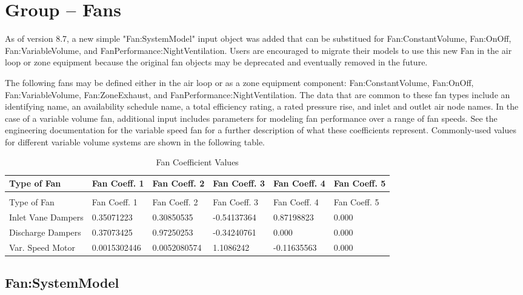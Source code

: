 \section{Group -- Fans}\label{group-fans}

As of version 8.7, a new simple "Fan:SystemModel" input object was added that can be substitued for Fan:ConstantVolume, Fan:OnOff, Fan:VariableVolume, and FanPerformance:NightVentilation.  Users are encouraged to migrate their models to use this new Fan in the air loop or zone equipment because the original fan objects may be deprecated and eventually removed in the future. 

The following fans may be defined either in the air loop or as a zone equipment component: Fan:ConstantVolume, Fan:OnOff, Fan:VariableVolume, Fan:ZoneExhaust, and FanPerformance:NightVentilation. The data that are common to these fan types include an identifying name, an availability schedule name, a total efficiency rating, a rated pressure rise, and inlet and outlet air node names. In the case of a variable volume fan, additional input includes parameters for modeling fan performance over a range of fan speeds. See the engineering documentation for the variable speed fan for a further description of what these coefficients represent. Commonly-used values for different variable volume systems are shown in the following table.

\begin{longtable}[c]{p{1.0in}p{1.0in}p{1.0in}p{1.0in}p{1.0in}p{1.0in}}
\caption{Fan Coefficient Values \label{table:fan-coefficient-values}} \tabularnewline
\toprule 
Type of Fan & Fan Coeff. 1 & Fan Coeff. 2 & Fan Coeff. 3 & Fan Coeff. 4 & Fan Coeff. 5 \tabularnewline
\midrule
\endfirsthead

\caption[]{Fan Coefficient Values} \tabularnewline
\toprule 
Type of Fan & Fan Coeff. 1 & Fan Coeff. 2 & Fan Coeff. 3 & Fan Coeff. 4 & Fan Coeff. 5 \tabularnewline
\midrule
\endhead

Inlet Vane Dampers & 0.35071223 & 0.30850535 & -0.54137364 & 0.87198823 & 0.000 \tabularnewline
Discharge Dampers & 0.37073425 & 0.97250253 & -0.34240761 & 0.000 & 0.000 \tabularnewline
Var. Speed Motor & 0.0015302446 & 0.0052080574 & 1.1086242 & -0.11635563 & 0.000 \tabularnewline
\bottomrule
\end{longtable}

\subsection{Fan:SystemModel}\label{fansystemmodel}

